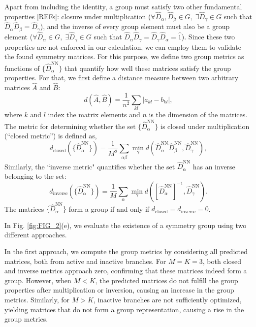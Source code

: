 Apart from including the identity, a group must satisfy two other fundamental properties [REFs]:  closure under multiplication ($\forall \hat{D}_{\alpha}, \hat{D}_{\beta} \in G, \; \exists \hat{D}_{\gamma} \in G$ such that $\hat{D}_{\alpha}\hat{D}_{\beta} = \hat{D}_{\gamma}$), and the inverse of every group element must also be a group element ($\forall \hat{D}_{\alpha} \in G, \; \exists \hat{D}_{\gamma} \in G$ such that $\hat{D}_{\alpha}\hat{D}_{\gamma} = \hat{D}_{\gamma}\hat{D}_{\alpha} = \hat{1}$).  Since these two properties are not enforced in our calculation, we can employ them to validate the found symmetry matrices.  For this purpose, we define two group metrics as functions of $\{ \hat{D}_{\alpha}^{\mathrm{NN}} \}$ that quantify how well these matrices satisfy the group properties. For that, we first define a distance measure between two arbitrary matrices $\hat{A}$ and $\hat{B}$:
%
\begin{equation}
    d( \hat{A} , \hat{B} ) = \frac{1}{n^2} \sum_{k l} |a_{kl} - b_{kl}|,
\end{equation}
%
where $k$ and $l$ index the matrix elements and $n$ is the dimension of the matrices. The metric for determining whether the set $\{ \hat{D}^{\mathrm{NN}}_{\alpha} \}$ is closed under multiplication (``closed metric'') is defined as,
%
\begin{equation}\label{eq:dclosed}
    d_{\mathrm{closed}} (\{ \hat{D}^{\mathrm{NN}}_{\alpha} \}) = \frac{1}{M^2} \sum_{\alpha \beta} \min_{\gamma} d( \hat{D}^{\mathrm{NN}}_{\alpha}\hat{D}^{\mathrm{NN}}_{\beta} , \hat{D}^{\mathrm{NN}}_{\gamma}),
\end{equation}
%
Similarly, the ``inverse metric" quantifies whether the set ${\hat{D}^{\mathrm{NN}}_{\alpha}}$ has an inverse belonging to the set:
%
\begin{equation}\label{eq:dinverse}
    d_{\mathrm{inverse}}(\{ \hat{D}^{\mathrm{NN}}_{\alpha} \}) = \frac{1}{M} \sum_{\alpha} \min_{\gamma} d( \left[ \hat{D}^{\mathrm{NN}}_{\alpha}\right]^{-1}, \hat{D}^{\mathrm{NN}}_{\gamma} ).
\end{equation}
%
The matrices $\{ \hat{D}^{\mathrm{NN}}_{\alpha} \}$ form a group if and only if $d_{\mathrm{closed}} = d_{\mathrm{inverse}} = 0$.

In Fig. \ref{fig:FIG_2}(e), we evaluate the existence of a symmetry group using two different approaches.

In the first approach, we compute the group metrics by considering all predicted matrices, both from active and inactive branches. For $M = K = 3$, both closed and inverse metrics approach zero, confirming that these matrices indeed form a group. However, when $M < K$, the predicted matrices do not fulfill the group properties after multiplication or inversion, causing an increase in the group metrics. Similarly, for $M > K$, inactive branches are not sufficiently optimized, yielding matrices that do not form a group representation, causing a rise in the group metrics.

